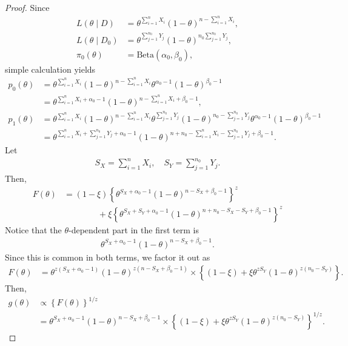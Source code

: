 \documentclass[12pt]{article}
\begin{document}
\begin{proof}
   Since
   \begin{align*}
       L(\theta \mid D) &= \theta^{\sum^n_{i=1}X_i}(1 - \theta)^{n - \sum^n_{i=1}X_i}, \\
       L(\theta \mid D_0) &= \theta^{\sum^{n_0}_{j=1}Y_j}(1 - \theta)^{n_0 \sum^{n_0}_{j=1}Y_j}, \\
       \pi_0(\theta) &= \mathrm{Beta}(\alpha_0, \beta_0),
   \end{align*}
   simple calculation yields
   \begin{align*}
       p_0(\theta) &= \theta^{\sum^{n}_{i=1}X_i}(1 - \theta)^{n - \sum^n_{i=1}X_i}\theta^{\alpha_0 - 1}(1-\theta)^{\beta_0 - 1} \\
       &= \theta^{\sum^n_{i=1}X_i + \alpha_0 - 1}(1 - \theta)^{n - \sum^n_{i=1}X_i + \beta_0 - 1}, \\
       p_1(\theta) &= \theta^{\sum^n_{i=1}X_i}(1 - \theta)^{n - \sum^n_{i=1}X_i}\theta^{\sum^{n_0}_{j=1}Y_j}(1 - \theta)^{n_0 - \sum^{n_0}_{j=1}Y_j}\theta^{\alpha_0 - 1}(1 - \theta)^{\beta_0 - 1} \\
       &= \theta^{\sum^n_{i=1}X_i + \sum^{n_0}_{j=1}Y_j + \alpha_0 - 1}(1 - \theta)^{n + n_0 - \sum^n_{i=1}X_i - \sum^{n_0}_{j=1}Y_j + \beta_0 - 1}.
   \end{align*}
   Let
   \begin{align*}
       S_X = \sum^n_{i=1}X_i, \quad S_Y = \sum^{n_0}_{j=1}Y_j.
   \end{align*}
   Then,
   \begin{align*}
       F(\theta) &= (1 - \xi)\left\{\theta^{S_X + \alpha_0 - 1}(1 - \theta)^{n - S_X + \beta_0 - 1}\right\}^z \\
       &\quad\quad\quad\quad + \xi\left\{\theta^{S_X + S_Y + \alpha_0 - 1}(1 - \theta)^{n + n_0 - S_X - S_Y + \beta_0 - 1}\right\}^z
   \end{align*}
   Notice that the $\theta$-dependent part in the first term is
   \begin{align*}
        \theta^{S_X + \alpha_0 - 1}(1 - \theta)^{n - S_X + \beta_0 - 1}.
   \end{align*}
   Since this is common in both terms, we factor it out as
   \begin{align*}
       F(\theta) &= \theta^{z(S_X + \alpha_0 - 1)}(1 - \theta)^{z(n - S_X + \beta_0 - 1)} \times \left\{(1 - \xi) + \xi \theta^{z S_Y}(1 - \theta)^{z(n_0 - S_Y)}\right\}.
   \end{align*}
   Then,
   \begin{align*}
       g(\theta) &\propto \left\{F(\theta)\right\}^{1/z} \\
       &= \theta^{S_X + \alpha_0 - 1}(1 - \theta)^{n - S_X + \beta_0 - 1} \times \left\{(1 - \xi) + \xi \theta^{z S_Y}(1 - \theta)^{z(n_0 - S_Y)}\right\}^{1/z}.
   \end{align*}
\end{proof}
\end{document}
